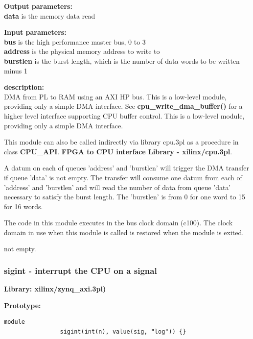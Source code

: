             {\bf Output parameters:} \\
            {\bf data} is the memory data read

            {\bf Input parameters:} \\            
            {\bf bus} is the high performance master bus, 0 to 3 \\  
            {\bf address} is the physical memory address to write to \\  
            {\bf burstlen} is the burst length, which is the number of data
            words to be written minus 1

            {\bf description:} \\            
            DMA from PL to RAM using an AXI HP bus.
            This is a low-level module, providing only a simple DMA interface.
            See {\bf cpu\_write\_dma\_buffer()} 
            for a higher level interface supporting CPU buffer control.
            This is a low-level module, providing only a simple DMA interface.            
            
            This module can also be called indirectly via library cpu.3pl
            as a procedure in class {\bf CPU\_API}.
             {\bf FPGA to CPU interface Library
            - xilinx/cpu.3pl}.
    
            A datum on each of queues 'address' and 'burstlen' will trigger the
            DMA transfer if queue 'data' is not empty. The transfer will consume
            one datum from each of 'address' and 'burstlen' and will read the
            number of data from queue 'data' necessary to satisfy the burst
            length. The 'burstlen' is from 0 for one word to 15 for 16 words.

            The code in this module executes in the bus clock domain (c100).
            The clock domain in use when this module is called is restored when
            the module is exited.

            not empty.

        \subsubsection{sigint - interrupt the CPU on a signal}\label{sec:lmzynqcpusigint}

            {\bf Library: xilinx/zynq\_axi.3pl)}

            {\bf Prototype:} \\
            \vsp
            \begin{lstlisting}[gobble=12, language=threepl]
                module
                sigint(int(n), value(sig, "log")) {}
            \end{lstlisting}
            
